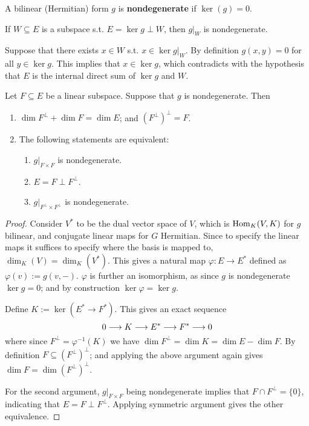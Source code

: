 \begin{definition}
    A bilinear (Hermitian) form $g$ is \textbf{nondegenerate} if $\ker(g) = 0$.
\end{definition}

\begin{remark}
    If $W \subseteq E$ is a subspace s.t. $E = \ker g \perp W$, then $g|_W$ is nondegenerate. 

    Suppose that there exists $x \in W$ s.t. $x \in \ker g|_W$. By definition $g(x, y) = 0$ for all $y \in \ker g$. This implies that $x \in \ker g$, which contradicts with the hypothesis that $E$ is the internal direct sum of $\ker g$ and $W$.
\end{remark}

\begin{proposition}
    Let $F \subseteq E$ be a linear subspace. Suppose that $g$ is nondegenerate. Then
    \begin{enumerate}[label=\roman*)]
        \item $\dim F^{\perp} + \dim F = \dim E$; and $(F^{\perp})^{\perp} = F$.
        \item The following statements are equivalent:
        \begin{enumerate}
            \item $g|_{F \times F}$ is nondegenerate.
            \item $E = F \perp F^{\perp}$.
            \item $g|_{F^{\perp} \times F^{\perp}}$ is nondegenerate.
        \end{enumerate}
    \end{enumerate}
\end{proposition}

\begin{proof}
    Consider $V^*$ to be the dual vector space of $V$, which is $\mathrm{Hom}_K(V, K)$ for $g$ bilinear, and conjugate linear maps for $G$ Hermitian. Since to specify the linear maps it suffices to specify where the basis is mapped to, $\dim_K(V) = \dim_K(V^{\ast})$. This gives a natural map $\varphi: E \to E^{\ast}$ defined as $\varphi(v) := g(v, -)$. $\varphi$ is further an isomorphism, as since $g$ is nondegenerate $\ker g = 0$; and by construction $\ker \varphi = \ker g$.

    Define $K := \ker (E^{\ast} \to F^{\ast})$. This gives an exact sequence
    \[
        0 \longrightarrow K \longrightarrow E^{\ast} \longrightarrow F^{\ast} \longrightarrow 0
    \]
    where since $F^{\perp} = \varphi^{-1}(K)$ we have $\dim F^{\perp} = \dim K = \dim E - \dim F$. By definition $F \subseteq (F^{\perp})^{\perp}$; and applying the above argument again gives $\dim F = \dim (F^{\perp})^{\perp}$.
    
    For the second argument, $g|_{F \times F}$ being nondegenerate implies that $F \cap F^{\perp} = \{0\}$, indicating that $E = F \perp F^{\perp}$. Applying symmetric argument gives the other equivalence.
\end{proof}

